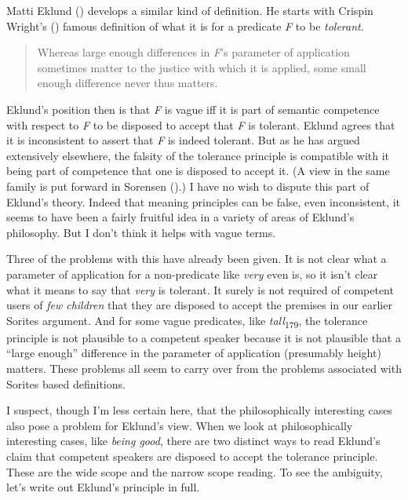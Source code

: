\documentclass[
  10pt,
  letterpaper,
  DIV=11,
  numbers=noendperiod,
  twoside]{scrartcl}
\begin{document}
Matti Eklund () develops a similar kind
of definition. He starts with Crispin Wright's
() famous definition of what it is for a
predicate \emph{F} to be \emph{tolerant}.

\begin{quote}
Whereas large enough differences in \emph{F}'s parameter of application
sometimes matter to the justice with which it is applied, some small
enough difference never thus matters.
\end{quote}

Eklund's position then is that \emph{F} is vague iff it is part of
semantic competence with respect to \emph{F} to be disposed to accept
that \emph{F} is tolerant. Eklund agrees that it is inconsistent to
assert that \emph{F} is indeed tolerant. But as he has argued
extensively elsewhere, the falsity of the tolerance principle is
compatible with it being part of competence that one is disposed to
accept it. (A view in the same family is put forward in Sorensen
().) I have no wish to dispute this
part of Eklund's theory. Indeed that meaning principles can be false,
even inconsistent, it seems to have been a fairly fruitful idea in a
variety of areas of Eklund's philosophy. But I don't think it helps with
vague terms.

Three of the problems with this have already been given. It is not clear
what a parameter of application for a non-predicate like \emph{very}
even is, so it isn't clear what it means to say that \emph{very} is
tolerant. It surely is not required of competent users of \emph{few
children} that they are disposed to accept the premises in our earlier
Sorites argument. And for some vague predicates, like
\emph{tall}\textsubscript{179}, the tolerance principle is not plausible
to a competent speaker because it is not plausible that a ``large
enough'' difference in the parameter of application (presumably height)
matters. These problems all seem to carry over from the problems
associated with Sorites based definitions.

I suspect, though I'm less certain here, that the philosophically
interesting cases also pose a problem for Eklund's view. When we look at
philosophically interesting cases, like \emph{being good}, there are two
distinct ways to read Eklund's claim that competent speakers are
disposed to accept the tolerance principle. These are the wide scope and
the narrow scope reading. To see the ambiguity, let's write out Eklund's
principle in full.
\end{document}
